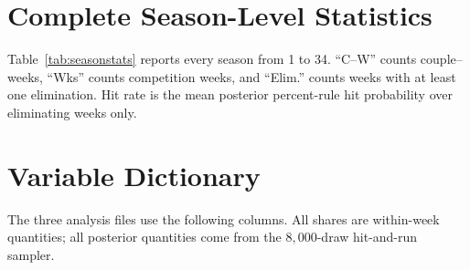 
\section{Complete Season-Level Statistics}\label{app:seasons}

Table~\ref{tab:seasonstats} reports every season from 1 to 34. ``C--W'' counts couple--weeks,
``Wks'' counts competition weeks, and ``Elim.'' counts weeks with at least one elimination.
Hit rate is the mean posterior percent-rule hit probability over eliminating weeks only.



\section{Variable Dictionary}\label{app:variables}

The three analysis files use the following columns. All shares are within-week quantities;
all posterior quantities come from the $8{,}000$-draw hit-and-run sampler.

